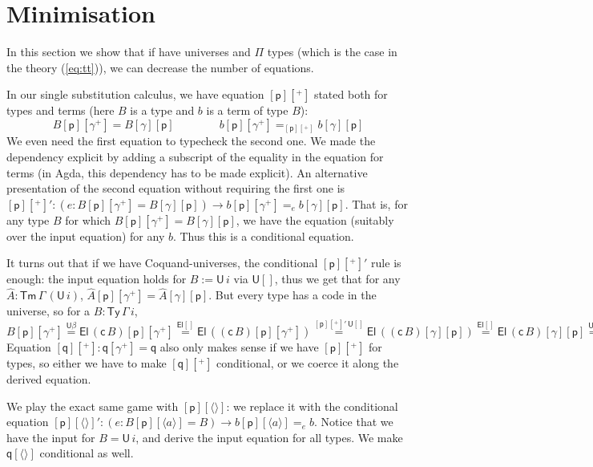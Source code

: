 \documentclass[a4paper,UKenglish]{article}
\newcommand{\ra}{\rightarrow}
\newcommand{\Ty}{\mathsf{Ty}}
\newcommand{\Tm}{\mathsf{Tm}}
\newcommand{\p}{\mathsf{p}}
\newcommand{\q}{\mathsf{q}}
\newcommand{\U}{\mathsf{U}}
\newcommand{\El}{\mathsf{El}}
\newcommand{\cd}{\mathsf{c}}
\begin{document}
\section{Minimisation}
\label{sec:minimisation}

In this section we show that if have universes and $\Pi$ types
(which is the case in the theory (\ref{eq:tt})), we can decrease the
number of equations.

In our single substitution calculus, we have equation $[\p][^+]$
stated both for types and terms (here $B$ is a type and $b$ is a term of type $B$):
\[
B[\p][\gamma^+] = B[\gamma][\p] \hspace{4em} b[\p][\gamma^+] =_{[\p][^+]} b[\gamma][\p]
\]
We even need the first equation to typecheck the second one. We made
the dependency explicit by adding a subscript of the equality in the
equation for terms (in Agda, this dependency has to be made
explicit). An alternative presentation of the second equation without
requiring the first one is
$
[\p][^+]' : (e : B[\p][\gamma^+] = B[\gamma][\p])\ra b[\p][\gamma^+] =_{e} b[\gamma][\p].
$
That is, for any type $B$ for which $B[\p][\gamma^+] = B[\gamma][\p]$,
we have the equation (suitably over the input
equation) for any $b$. Thus this is a conditional equation.

It turns out that if we have Coquand-universes, the conditional
$[\p][^+]'$ rule is enough: the input equation holds for $B := \U\,i$
via $\U[]$, thus we get that for any $\hat{A} : \Tm\,\Gamma\,(\U\,i)$,
$\hat{A}[\p][\gamma^+] = \hat{A}[\gamma][\p]$. But every type has a
code in the universe, so for a $B : \Ty\,\Gamma\,i$,
$
B[\p][\gamma^+] \overset{\U\beta}{=}
\El\,(\cd\,B)[\p][\gamma^+] \overset{\El[]}{=}
\El\,((\cd\,B)[\p][\gamma^+]) \overset{[\p][^+]'\,\U[]}{=}
\El\,((\cd\,B)[\gamma][\p]) \overset{\El[]}{=}
\El\,(\cd\,B)[\gamma][\p] \overset{\U\beta}{=}
B[\gamma][\p].
$
Equation $[\q][^+] : \q[\gamma^+] = \q$ also only makes sense if we
have $[\p][^+]$ for types, so either we have to make $[\q][^+]$
conditional, or we coerce it along the derived equation.

We play the exact same game with $[\p][\langle\rangle]$: we replace it
with the conditional equation
$
[\p][\langle\rangle]' : (e:B[\p][\langle a\rangle] = B)\ra b[\p][\langle a\rangle] =_e b.
$
Notice that we have the input for $B = \U\,i$, and derive the input
equation for all types. We make $\q[\langle\rangle]$ conditional as
well.
\end{document}

